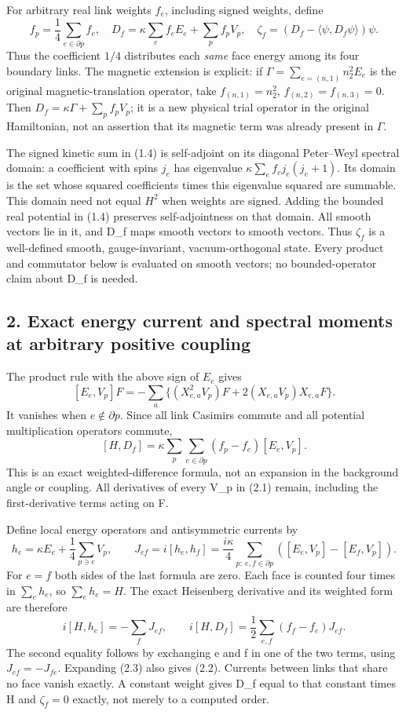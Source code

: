 \documentclass[
  11pt,
]{article}
\begin{document}
For arbitrary real link weights \(f_e\), including signed weights,
define \[
 f_p=\frac14\sum_{e\in\partial p}f_e,\quad
 D_f=\kappa\sum_e f_eE_e+\sum_p f_pV_p,
 \quad \zeta_f=(D_f-\langle\psi,D_f\psi\rangle)\psi.
\tag{1.4}
\] Thus the coefficient \(1/4\) distributes each \emph{same} face energy
among its four boundary links. The magnetic extension is explicit: if
\(\Gamma=\sum_{e=(n,1)}n_2^2E_e\) is the original magnetic-translation
operator, take \(f_{(n,1)}=n_2^2\), \(f_{(n,2)}=f_{(n,3)}=0\). Then
\(D_f=\kappa\Gamma+\sum_p f_pV_p\); it is a new physical trial operator
in the original Hamiltonian, not an assertion that its magnetic term was
already present in \(\Gamma\).

The signed kinetic sum in (1.4) is self-adjoint on its diagonal
Peter--Weyl spectral domain: a coefficient with spins \(j_e\) has
eigenvalue \(\kappa\sum_e f_ej_e(j_e+1)\). Its domain is the set whose
squared coefficients times this eigenvalue squared are summable. This
domain need not equal \(H^2\) when weights are signed. Adding the
bounded real potential in (1.4) preserves self-adjointness on that
domain. All smooth vectors lie in it, and D\_f maps smooth vectors to
smooth vectors. Thus \(\zeta_f\) is a well-defined smooth,
gauge-invariant, vacuum-orthogonal state. Every product and commutator
below is evaluated on smooth vectors; no bounded-operator claim about
D\_f is needed.

\subsection{2. Exact energy current and spectral moments at arbitrary
positive
coupling}\label{magnetic-part-3-exact-energy-current-and-spectral-moments-at-arbitrary-positive-coupling}

The product rule with the above sign of \(E_e\) gives \[
 [E_e,V_p]F=-\sum_a\{(X_{e,a}^2V_p)F
                       +2(X_{e,a}V_p)X_{e,a}F\}.
\tag{2.1}
\] It vanishes when \(e\notin\partial p\). Since all link Casimirs
commute and all potential multiplication operators commute, \[
 [H,D_f]=\kappa\sum_{p}\sum_{e\in\partial p}
                         (f_p-f_e)[E_e,V_p].
\tag{2.2}
\] This is an exact weighted-difference formula, not an expansion in the
background angle or coupling. All derivatives of every V\_p in (2.1)
remain, including the first-derivative terms acting on F.

Define local energy operators and antisymmetric currents by \[
 h_e=\kappa E_e+\frac14\sum_{p\ni e}V_p,\qquad
 J_{ef}=i[h_e,h_f]
       =\frac{i\kappa}{4}\sum_{p:\ e,f\in\partial p}
                         ([E_e,V_p]-[E_f,V_p]).
\tag{2.3}
\] For \(e=f\) both sides of the last formula are zero. Each face is
counted four times in \(\sum_e h_e\), so \(\sum_e h_e=H\). The exact
Heisenberg derivative and its weighted form are therefore \[
 i[H,h_e]=-\sum_fJ_{ef},\qquad
 i[H,D_f]=\frac12\sum_{e,f}(f_f-f_e)J_{ef}.
\tag{2.4}
\] The second equality follows by exchanging e and f in one of the two
terms, using \(J_{ef}=-J_{fe}\). Expanding (2.3) also gives (2.2).
Currents between links that share no face vanish exactly. A constant
weight gives D\_f equal to that constant times H and \(\zeta_f=0\)
exactly, not merely to a computed order.
\end{document}
